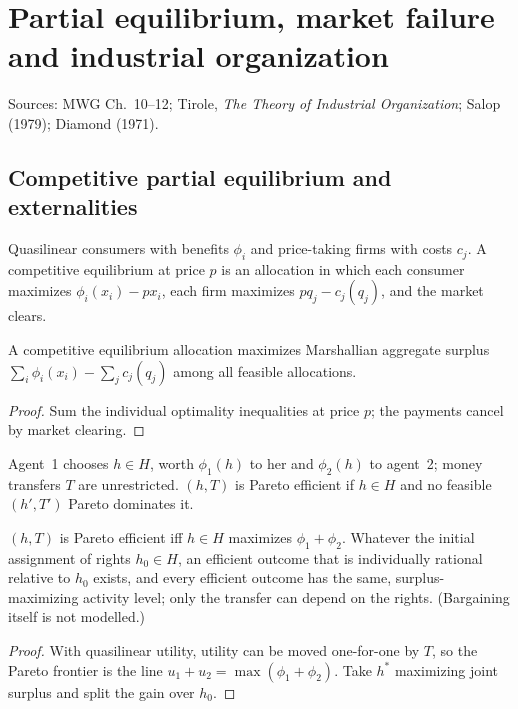 \chapter{Partial equilibrium, market failure and industrial organization}
\label{chap:partial}

Sources: MWG Ch.~10--12; Tirole, \emph{The Theory of Industrial Organization}; Salop (1979); Diamond (1971).

\section{Competitive partial equilibrium and externalities}

\begin{definition}
\label{def:partial-eq}
\leanok
Quasilinear consumers with benefits $\phi_i$ and price-taking firms with costs $c_j$. A competitive equilibrium
at price $p$ is an allocation in which each consumer maximizes $\phi_i(x_i) - p x_i$, each firm maximizes
$p q_j - c_j(q_j)$, and the market clears.
\end{definition}

\begin{theorem}
\label{thm:competitive-surplus}
\leanok
{}
A competitive equilibrium allocation maximizes Marshallian aggregate surplus $\sum_i \phi_i(x_i) - \sum_j c_j(q_j)$
among all feasible allocations.
\end{theorem}
\begin{proof}
\leanok
Sum the individual optimality inequalities at price $p$; the payments cancel by market clearing.
\end{proof}

\begin{definition}
\label{def:coase}
\leanok
Agent~1 chooses $h \in H$, worth $\phi_1(h)$ to her and $\phi_2(h)$ to agent~2; money transfers $T$ are unrestricted.
$(h, T)$ is Pareto efficient if $h \in H$ and no feasible $(h', T')$ Pareto dominates it.
\end{definition}

\begin{theorem}
\label{thm:coase}
\leanok
{}
$(h,T)$ is Pareto efficient iff $h \in H$ maximizes $\phi_1 + \phi_2$. Whatever the initial assignment of rights
$h_0 \in H$, an efficient outcome that is individually rational relative to $h_0$ exists, and every efficient
outcome has the same, surplus-maximizing activity level; only the transfer can depend on the rights. (Bargaining
itself is not modelled.)
\end{theorem}
\begin{proof}
\leanok
With quasilinear utility, utility can be moved one-for-one by $T$, so the Pareto frontier is the line
$u_1 + u_2 = \max(\phi_1 + \phi_2)$. Take $h^*$ maximizing joint surplus and split the gain over $h_0$.
\end{proof}

